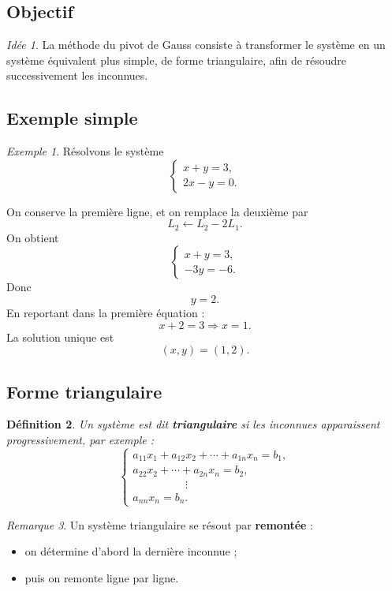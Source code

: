 \documentclass[11pt,a4paper]{article}
\newtheorem{definition}{Définition}[section]
\theoremstyle{remark}
\newtheorem{remarque}[definition]{Remarque}
\newtheorem{exemple}[definition]{Exemple}
\newtheorem*{idee}{Idée}
\begin{document}
\subsection{Objectif}

\begin{idee}
La méthode du pivot de Gauss consiste à transformer le système en un système équivalent plus simple, de forme triangulaire, afin de résoudre successivement les inconnues.
\end{idee}

\subsection{Exemple simple}

\begin{exemple}
Résolvons le système
\[
\begin{cases}
x+y=3,\\
2x-y=0.
\end{cases}
\]

On conserve la première ligne, et on remplace la deuxième par
\[
L_2 \leftarrow L_2-2L_1.
\]
On obtient
\[
\begin{cases}
x+y=3,\\
-3y=-6.
\end{cases}
\]
Donc
\[
y=2.
\]
En reportant dans la première équation :
\[
x+2=3 \Longrightarrow x=1.
\]
La solution unique est
\[
(x,y)=(1,2).
\]
\end{exemple}

\subsection{Forme triangulaire}

\begin{definition}
Un système est dit \textbf{triangulaire} si les inconnues apparaissent progressivement, par exemple :
\[
\begin{cases}
a_{11}x_1+a_{12}x_2+\cdots+a_{1n}x_n=b_1,\\
a_{22}x_2+\cdots+a_{2n}x_n=b_2,\\
\hspace{2cm}\vdots\\
a_{nn}x_n=b_n.
\end{cases}
\]
\end{definition}

\begin{remarque}
Un système triangulaire se résout par \textbf{remontée} :
\begin{itemize}
    \item on détermine d’abord la dernière inconnue ;
    \item puis on remonte ligne par ligne.
\end{itemize}
\end{remarque}
\end{document}
